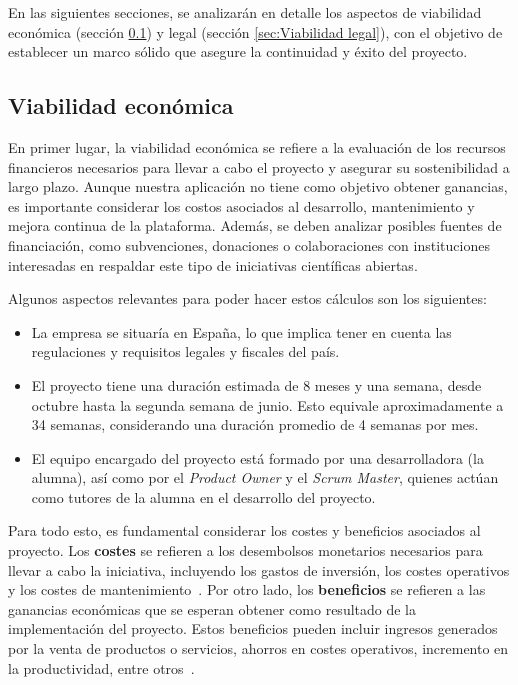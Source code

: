 En las siguientes secciones, se analizarán en detalle los aspectos de viabilidad económica (sección \ref{sec:Viabilidad económica}) y legal (sección \ref{sec:Viabilidad legal}), con el objetivo de establecer un marco sólido que asegure la continuidad y éxito del proyecto.

\subsection{Viabilidad económica}
\label{sec:Viabilidad económica}
En primer lugar, la viabilidad económica se refiere a la evaluación de los recursos financieros necesarios para llevar a cabo el proyecto y asegurar su sostenibilidad a largo plazo. Aunque nuestra aplicación no tiene como objetivo obtener ganancias, es importante considerar los costos asociados al desarrollo, mantenimiento y mejora continua de la plataforma. Además, se deben analizar posibles fuentes de financiación, como subvenciones, donaciones o colaboraciones con instituciones interesadas en respaldar este tipo de iniciativas científicas abiertas.

Algunos aspectos relevantes para poder hacer estos cálculos son los siguientes: 
\begin{itemize}
    \item La empresa se situaría en España, lo que implica tener en cuenta las regulaciones y requisitos legales y fiscales del país.
    \item El proyecto tiene una duración estimada de 8 meses y una semana, desde octubre hasta la segunda semana de junio. Esto equivale aproximadamente a 34 semanas, considerando una duración promedio de 4 semanas por mes.
    \item El equipo encargado del proyecto está formado por una desarrolladora (la alumna), así como por el \textit{Product Owner} y el \textit{Scrum Master}, quienes actúan como tutores de la alumna en el desarrollo del proyecto.
\end{itemize}

Para todo esto, es fundamental considerar los costes y beneficios asociados al proyecto. Los \textbf{costes} se refieren a los desembolsos monetarios necesarios para llevar a cabo la iniciativa, incluyendo los gastos de inversión, los costes operativos y los costes de mantenimiento~\cite{costebeneficio2006}. Por otro lado, los \textbf{beneficios} se refieren a las ganancias económicas que se esperan obtener como resultado de la implementación del proyecto. Estos beneficios pueden incluir ingresos generados por la venta de productos o servicios, ahorros en costes operativos, incremento en la productividad, entre otros~\cite{costebeneficio2006}. 

